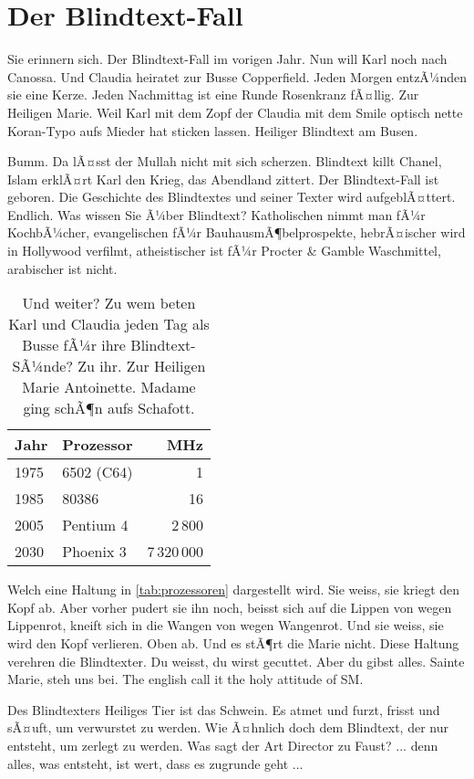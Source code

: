 \documentclass{scrartcl}
\begin{document}
  \section{Der Blindtext-Fall}

  Sie erinnern sich. Der Blindtext-Fall im vorigen Jahr. Nun will Karl noch nach Canossa. Und Claudia heiratet zur Busse Copperfield. Jeden Morgen entzÃ¼nden sie eine Kerze. Jeden Nachmittag ist eine Runde Rosenkranz fÃ¤llig. Zur Heiligen Marie. Weil Karl mit dem Zopf der Claudia mit dem Smile optisch nette Koran-Typo aufs Mieder hat sticken lassen. Heiliger Blindtext am Busen.

  Bumm. Da lÃ¤sst der Mullah nicht mit sich scherzen. Blindtext killt Chanel, Islam erklÃ¤rt Karl den Krieg, das Abendland zittert. Der Blindtext-Fall ist geboren. Die Geschichte des Blindtextes und seiner Texter wird aufgeblÃ¤ttert. Endlich. Was wissen Sie Ã¼ber Blindtext? Katholischen nimmt man fÃ¼r KochbÃ¼cher, evangelischen fÃ¼r BauhausmÃ¶belprospekte, hebrÃ¤ischer wird in Hollywood verfilmt, atheistischer ist fÃ¼r Procter \& Gamble Waschmittel, arabischer ist nicht.

  \begin{table}
    \centering
    \begin{tabular}{l|lr}
      \textbf{Jahr} & \textbf{Prozessor} & \textbf{MHz} \\ \hline
      1975 & 6502 (C64) & 1 \\
      1985 & 80386 & 16 \\
      2005 & Pentium 4 & 2\,800 \\
      2030 & Phoenix 3 & 7\,320\,000
    \end{tabular}
    \caption{Und weiter? Zu wem beten Karl und Claudia jeden Tag als Busse fÃ¼r ihre Blindtext-SÃ¼nde? Zu ihr. Zur Heiligen Marie Antoinette. Madame ging schÃ¶n aufs Schafott.}
    \label{tab:prozessoren}
  \end{table}

  Welch eine Haltung in \autoref{tab:prozessoren} dargestellt wird. Sie weiss, sie kriegt den Kopf ab. Aber vorher pudert sie ihn noch, beisst sich auf die Lippen von wegen Lippenrot, kneift sich in die Wangen von wegen Wangenrot. Und sie weiss, sie wird den Kopf verlieren. Oben ab. Und es stÃ¶rt die Marie nicht. Diese Haltung verehren die Blindtexter. Du weisst, du wirst gecuttet. Aber du gibst alles. Sainte Marie, steh uns bei. The english call it the holy attitude of SM.

  Des Blindtexters Heiliges Tier ist das Schwein. Es atmet und furzt, frisst und sÃ¤uft, um verwurstet zu werden. Wie Ã¤hnlich doch dem Blindtext, der nur entsteht, um zerlegt zu werden. Was sagt der Art Director zu Faust? ... denn alles, was entsteht, ist wert, dass es zugrunde geht ...
\end{document}
